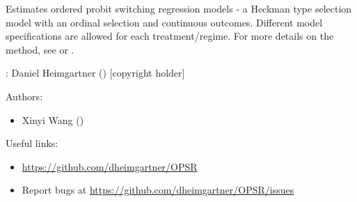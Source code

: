 
%
\begin{Description}
Estimates ordered probit switching regression models - a Heckman type selection model with an ordinal selection and continuous outcomes. Different model specifications are allowed for each treatment/regime. For more details on the method, see \citet{Wang+Mokhtarian:2024} or \citet{Chiburis+Lokshin:2007}.
\end{Description}
%
\begin{Author}
: Daniel Heimgartner  () [copyright holder]

Authors:
\begin{itemize}

\item{} Xinyi Wang  ()

\end{itemize}


\end{Author}
%
\begin{SeeAlso}
Useful links:
\begin{itemize}

\item{} \url{https://github.com/dheimgartner/OPSR}
\item{} Report bugs at \url{https://github.com/dheimgartner/OPSR/issues}

\end{itemize}


\end{SeeAlso}


